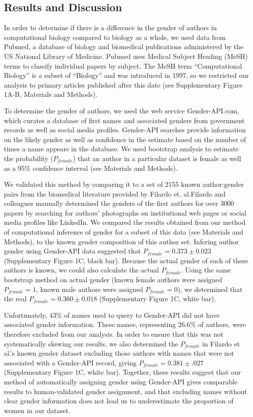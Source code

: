 \documentclass[10pt,letterpaper]{article}
\begin{document}
\begin{flushleft}
\section*{Results and Discussion}
In order to determine if there is a difference in the gender of authors in computational biology compared to biology as a whole, we used data from Pubmed, a database of biology and biomedical publications administered by the US National Library of Medicine. Pubmed uses Medical Subject Heading (MeSH) terms to classify individual papers by subject. The MeSH term “Computational Biology” is a subset of “Biology” and was introduced in 1997, so we restricted our analysis to primary articles published after this date (see Supplementary Figure 1A-B, Materials and Methods).

To determine the gender of authors, we used the web service Gender-API.com, which curates a database of first names and associated genders from government records as well as social media profiles. Gender-API searches provide information on the likely gender as well as confidence in the estimate based on the number of times a name appears in the database. We used bootstrap analysis to estimate the probability ($P_{female}$) that an author in a particular dataset is female as well as a 95\% confidence interval (see Materials and Methods).

We validated this method by comparing it to a set of 2155 known author:gender pairs from the biomedical literature provided by Filardo et. al.\cite{Filardo2016}Filardo and colleagues manually determined the genders of the first authors for over 3000 papers by searching for authors’ photographs on institutional web pages or social media profiles like LinkedIn. We compared the results obtained from our method of computational inference of gender for a subset of this data (see Materials and Methods), to the known gender composition of this author set. Infering author gender using Gender-API data suggested that $P_{female} = 0.373 \pm 0.023$ (Supplementary Figure 1C, black bar). Because the actual gender of each of these authors is known, we could also calculate the actual $P_{female}$. Using the same bootstrap method on actual gender (known female authors were assigned $P_{female} = 1$, known male authors were assigned $P_{female} = 0$), we determined that the real $P_{female} = 0.360 \pm 0.018$ (Supplementary Figure 1C, white bar).

Unfortunately, 43\% of names used to query to Gender-API did not have associated gender information. These names, representing 26.6\% of authors, were therefore excluded from our analysis. In order to ensure that this was not systematically skewing our results, we also determined the $P_{female}$ in Filardo et al.'s known gender dataset excluding those authors with names that were not associated with a Gender-API record, giving $P_{female} = 0.381 \pm .027$ (Supplementary Figure 1C, white bar). Together, these results suggest that our method of automatically assigning gender using Gender-API gives comparable results to human-validated gender assignment, and that excluding names without clear gender information does not lead us to underestimate the proportion of women in our dataset.


\end{flushleft}
\end{document}
